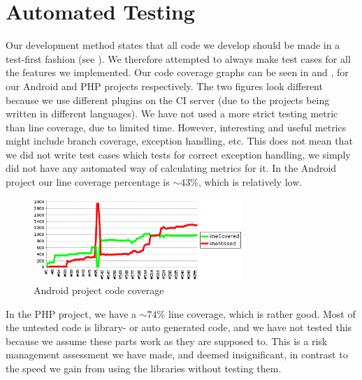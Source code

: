 
\section{Automated Testing}
\label{sec:automated_unit_test}

Our development method states that all code we develop should be made in a test-first fashion (see ). We therefore attempted to always make test cases for all the features we implemented. Our code coverage graphs can be seen in  and , for our Android and PHP projects respectively. The two figures look different because we use different plugins on the CI server (due to the projects being written in different languages). We have not used a more strict testing metric than line coverage, due to limited time. However, interesting and useful metrics might include branch coverage, exception handling, etc. This does not mean that we did not write test cases which tests for correct exception handling, we simply did not have any automated way of calculating metrics for it. In the Android project our line coverage percentage is $\sim 43\%$, which is relatively low. %


\begin{figure}[!htbp]
    \centering
    \includegraphics[width=0.7\textwidth]{graphic/quality_assurance/jenkins_android_code_coverage}
    \caption{Android project code coverage}
    \label{fig:android_project_code_coverage}
\end{figure}
\FloatBarrier

In the PHP project, we have a $\sim 74\%$ line coverage, which is rather good. Most of the untested code is library- or auto generated code, and we have not tested this because we assume these parts work as they are supposed to. This is a risk management assessment we have made, and deemed insignificant, in contrast to the speed we gain from using the libraries without testing them. %


